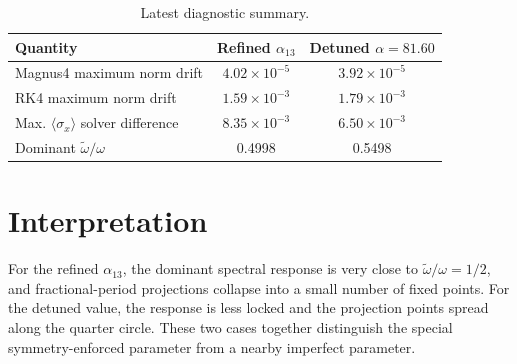 \documentclass[11pt,a4paper]{article}
\begin{document}
\begin{table}[h]
\centering
\caption{Latest diagnostic summary.}
\begin{tabular}{lcc}
\toprule
Quantity & Refined \(\alpha_{13}\) & Detuned \(\alpha=81.60\) \\
\midrule
Magnus4 maximum norm drift & \(4.02\times10^{-5}\) & \(3.92\times10^{-5}\) \\
RK4 maximum norm drift & \(1.59\times10^{-3}\) & \(1.79\times10^{-3}\) \\
Max. \(\langle\sigma_x\rangle\) solver difference & \(8.35\times10^{-3}\) & \(6.50\times10^{-3}\) \\
Dominant \(\tilde{\omega}/\omega\) & 0.4998 & 0.5498 \\
\bottomrule
\end{tabular}
\end{table}

\section{Interpretation}

For the refined \(\alpha_{13}\), the dominant spectral response is very close to \(\tilde{\omega}/\omega=1/2\), and fractional-period projections collapse into a small number of fixed points. For the detuned value, the response is less locked and the projection points spread along the quarter circle. These two cases together distinguish the special symmetry-enforced parameter from a nearby imperfect parameter.
\end{document}
